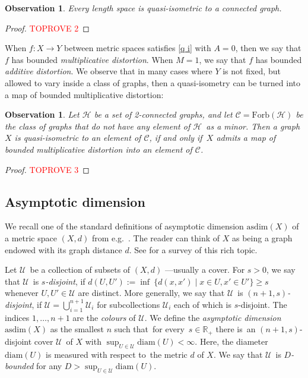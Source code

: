 \documentclass[a4paper]{article}
\newcommand{\defi}[1]{{\color{darkgray}\emph{#1}}}
\newtheorem{observation}[proposition]{Observation}
\newcommand{\R}{\ensuremath{\mathbb R}}
\newcommand{\cc}{\ensuremath{\mathcal C}}
\newcommand{\ch}{\ensuremath{\mathcal H}}
\newcommand{\cu}{\ensuremath{\mathcal U}}
\renewcommand{\iff}{if and only if}
\newcommand{\fe}{for every}
\newcommand{\st}{such that}
\newcommand{\ti}{there is}
\newcommand{\wrt}{with respect to}
\newcommand{\forb}[1]{\mathrm{Forb}(#1)}
\newcommand{\diam}{\mathrm{diam}}
\newcommand{\asdim}{\mathrm{asdim}}
\begin{document}
\begin{observation} \label{qi graph}
Every length space is quasi-isometric to a connected graph.
\end{observation}
\begin{proof}\textcolor{red}{TOPROVE 2}\end{proof}

When $f: X \to Y$ between metric spaces satisfies \ref{q i} 
with $A=0$, then we say that $f$ has bounded \defi{multiplicative distortion}. When $M=1$, we say that $f$ has bounded \defi{additive distortion}. We observe that in many cases where $Y$ is not fixed, but allowed to vary inside a class of graphs, then a quasi-isometry can be turned into a map of bounded multiplicative distortion: 
\begin{observation} \label{obs distortion}
Let $\ch$ be a set of 2-connected graphs, and let $\cc=\forb{\ch}$ be the class of graphs that do not have any element of \ch\ as a minor. Then a graph $X$ is quasi-isometric to an element of \cc, \iff\ $X$ admits a map of bounded multiplicative distortion into an element of \cc. 
\end{observation}
\begin{proof}\textcolor{red}{TOPROVE 3}\end{proof}

\subsection{Asymptotic dimension} \label{sec asdim}
We recall one of the standard definitions of asymptotic dimension $\asdim(X)$ of a metric space $(X,d)$  from e.g.\ \cite{JorLanGeo}. The reader can think of $X$ as being a graph endowed with its graph distance $d$. See  \cite{BelDraAsy} for a survey of this rich topic.
 \smallskip
 
Let \cu\ be a collection of subsets of $(X,d)$ ---usually a cover. For $s > 0$, we say that \cu\ is \defi{$s$-disjoint}, if
$d(U,U') := \inf\ \{d(x, x') \mid x \in U, x' \in U'\} \geq s$
whenever $U,U'\in \cu$ are distinct. More generally, we say that \cu\ is \defi{$(n+1,s)$-disjoint}, if $\cu = \bigcup_{i=1}^{n+1} \cu_i$ for subcollections $\cu_i$ each of which is $s$-disjoint. The indices $1,\ldots,n+1$ are the \defi{colours} of \cu. We define the \defi{asymptotic dimension} $\asdim(X)$ as the smallest $n$ \st\ \fe\ $s\in \R_+$ \ti\ an $(n+1,s)$-disjoint cover \cu\ of $X$ with $\sup_{U\in \cu} \diam(U)< \infty$. Here, the diameter $\diam(U)$ is measured \wrt\ the metric $d$ of $X$. We say that \cu\ is \defi{$D$-bounded} for any $D> \sup_{U\in \cu} \diam(U)$. 
\end{document}
